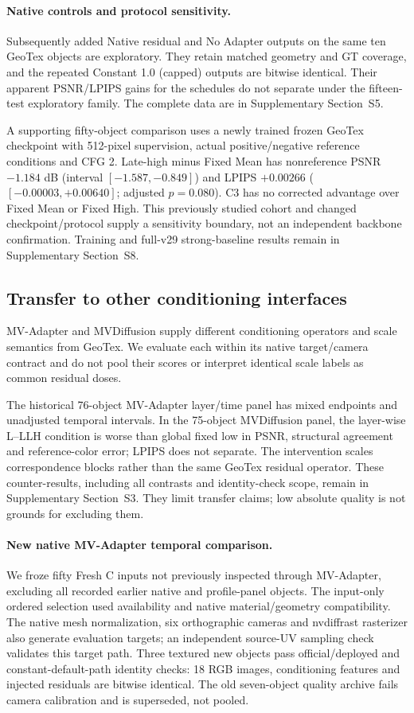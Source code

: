 \documentclass[times,twocolumn,final]{elsarticle}
\begin{document}
\paragraph{Native controls and protocol sensitivity.}
Subsequently added Native residual and No Adapter outputs on the same ten GeoTex objects are exploratory. They retain matched geometry and GT coverage, and the repeated Constant 1.0 (capped) outputs are bitwise identical. Their apparent PSNR/LPIPS gains for the schedules do not separate under the fifteen-test exploratory family. The complete data are in Supplementary Section~S5.

A supporting fifty-object comparison uses a newly trained frozen GeoTex checkpoint with 512-pixel supervision, actual positive/negative reference conditions and CFG 2. Late-high minus Fixed Mean has nonreference PSNR $-1.184$ dB (interval $[-1.587,-0.849]$) and LPIPS $+0.00266$ ($[-0.00003,+0.00640]$; adjusted $p=0.080$). C3 has no corrected advantage over Fixed Mean or Fixed High. This previously studied cohort and changed checkpoint/protocol supply a sensitivity boundary, not an independent backbone confirmation. Training and full-v29 strong-baseline results remain in Supplementary Section~S8.

\subsection{Transfer to other conditioning interfaces}
\label{subsec:cross-interface}
MV-Adapter and MVDiffusion supply different conditioning operators and scale semantics from GeoTex. We evaluate each within its native target/camera contract and do not pool their scores or interpret identical scale labels as common residual doses.

The historical 76-object MV-Adapter layer/time panel has mixed endpoints and unadjusted temporal intervals. In the 75-object MVDiffusion panel, the layer-wise L--LLH condition is worse than global fixed low in PSNR, structural agreement and reference-color error; LPIPS does not separate. The intervention scales correspondence blocks rather than the same GeoTex residual operator. These counter-results, including all contrasts and identity-check scope, remain in Supplementary Section~S3. They limit transfer claims; low absolute quality is not grounds for excluding them.

\paragraph{New native MV-Adapter temporal comparison.}
\label{subsec:new-mva}
We froze fifty Fresh C inputs not previously inspected through MV-Adapter, excluding all recorded earlier native and profile-panel objects. The input-only ordered selection used availability and native material/geometry compatibility. The native mesh normalization, six orthographic cameras and nvdiffrast rasterizer also generate evaluation targets; an independent source-UV sampling check validates this target path. Three textured new objects pass official/deployed and constant-default-path identity checks: 18 RGB images, conditioning features and injected residuals are bitwise identical. The old seven-object quality archive fails camera calibration and is superseded, not pooled.
\end{document}
